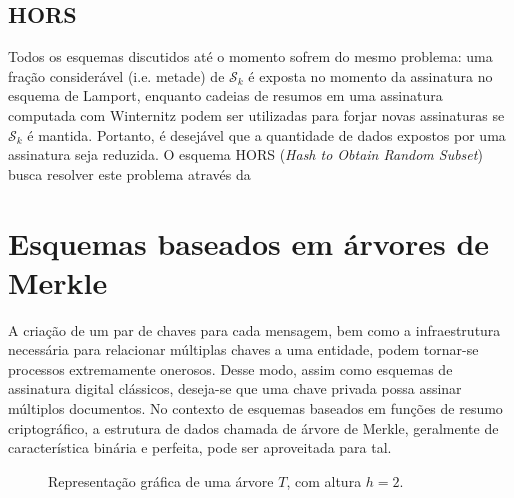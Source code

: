 \documentclass[12pt]{report}
\newcommand{\sk}{\mathcal{S}_k}
\newcommand{\hash}[2][]{\mathcal{H}^{#1}(#2)}
\newcommand{\concat}{\, \vert \vert \,}
\begin{document}
\subsection{HORS}

Todos os esquemas discutidos até o momento sofrem do mesmo problema: uma fração
considerável (i.e. metade) de $\sk{}$ é exposta no momento da assinatura no
esquema de Lamport, enquanto cadeias de resumos em uma assinatura computada
com Winternitz podem ser utilizadas para forjar novas assinaturas se $\sk{}$
é mantida. Portanto, é desejável que a quantidade de dados expostos por uma
assinatura seja reduzida. O esquema HORS (\emph{Hash to Obtain Random Subset})
busca resolver este problema através da 


\section{Esquemas baseados em árvores de Merkle}

A criação de um par de chaves para cada mensagem, bem como a infraestrutura
necessária para relacionar múltiplas chaves a uma entidade, podem tornar-se
processos extremamente onerosos. Desse modo, assim como esquemas de assinatura
digital clássicos, deseja-se que uma chave privada possa assinar múltiplos
documentos. No contexto de esquemas baseados em funções de resumo
criptográfico, a estrutura de dados chamada de árvore de Merkle, geralmente de
característica binária e perfeita, pode ser aproveitada para tal.

\begin{figure}[ht]
  \centering
  \caption{Representação gráfica de uma árvore $T$, com altura $h = 2$.}
  \label{fig:4}
\end{figure}
\end{document}
